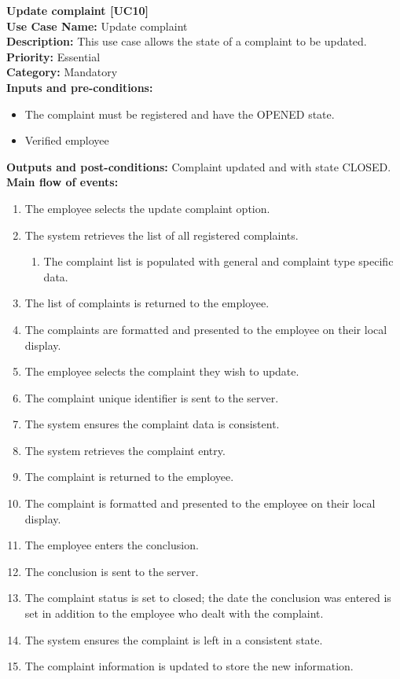 \documentclass[11pt,twoside]{article}
\begin{document}
\textbf{Update complaint [UC10]}\\
\textbf{Use Case Name:} Update complaint \\
\textbf{Description:} This use case allows the state of a complaint to be updated.\\
\textbf{Priority:} Essential\\
\textbf{Category:} Mandatory\\
\textbf{Inputs and pre-conditions:} 
\begin{itemize}
\item The complaint must be registered and have the OPENED state.
\item Verified employee
\end{itemize}
\textbf{Outputs and post-conditions:} Complaint updated and with state CLOSED.\\
\textbf{Main flow of events:}\\
\begin{enumerate}
\item The employee selects the update complaint option.
\item The system retrieves the list of all registered complaints.
\begin{enumerate}
\item The complaint list is populated with general and complaint type
specific data.
\end{enumerate}
\item The list of complaints is returned to the employee.
\item The complaints are formatted and presented to the employee on their
local display.
\item \label{uc10:ep01a}The employee selects the complaint they wish to update.
\item The complaint unique identifier is sent to the server.
\item The system ensures the complaint data is consistent.
\item The system retrieves the complaint entry.
\item The complaint is returned to the employee.
\item The complaint is formatted and presented to the employee on their local
display.
\item The employee enters the conclusion.
\item \label{uc10:ep01b}The conclusion is sent to the server.
\item The complaint status is set to closed; the date the conclusion was entered
is set in addition to the employee who dealt with the complaint.
\item The system ensures the complaint is left in a consistent state.
\item The complaint information is updated to store the new information.
\end{enumerate}
\end{document}
